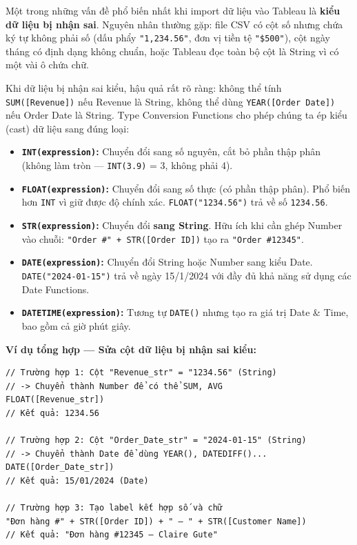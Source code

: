 \documentclass[12pt]{article}
\begin{document}
\noindent Một trong những vấn đề phổ biến nhất khi import dữ liệu vào Tableau là \textbf{kiểu dữ liệu bị nhận sai}. Nguyên nhân thường gặp: file CSV có cột số nhưng chứa ký tự không phải số (dấu phẩy \texttt{"1,234.56"}, đơn vị tiền tệ \texttt{"\$500"}), cột ngày tháng có định dạng không chuẩn, hoặc Tableau đọc toàn bộ cột là String vì có một vài ô chứa chữ.

\noindent Khi dữ liệu bị nhận sai kiểu, hậu quả rất rõ ràng: không thể tính \texttt{SUM([Revenue])} nếu Revenue là String, không thể dùng \texttt{YEAR([Order Date])} nếu Order Date là String. Type Conversion Functions cho phép chúng ta ép kiểu (cast) dữ liệu sang đúng loại:

\begin{itemize}
    \item \textbf{\texttt{INT(expression)}:} Chuyển đổi sang số nguyên, cắt bỏ phần thập phân (không làm tròn --- \texttt{INT(3.9)} = 3, không phải 4).

    \item \textbf{\texttt{FLOAT(expression)}:} Chuyển đổi sang số thực (có phần thập phân). Phổ biến hơn \texttt{INT} vì giữ được độ chính xác. \texttt{FLOAT("1234.56")} trả về số \texttt{1234.56}.

    \item \textbf{\texttt{STR(expression)}:} Chuyển đổi \textbf{sang String}. Hữu ích khi cần ghép Number vào chuỗi: \texttt{"Order \#" + STR([Order ID])} tạo ra \texttt{"Order \#12345"}.

    \item \textbf{\texttt{DATE(expression)}:} Chuyển đổi String hoặc Number sang kiểu Date. \texttt{DATE("2024-01-15")} trả về ngày 15/1/2024 với đầy đủ khả năng sử dụng các Date Functions.

    \item \textbf{\texttt{DATETIME(expression)}:} Tương tự \texttt{DATE()} nhưng tạo ra giá trị Date \& Time, bao gồm cả giờ phút giây.
\end{itemize}

\noindent \textbf{Ví dụ tổng hợp --- Sửa cột dữ liệu bị nhận sai kiểu:}

\begin{aivncodebox}[]
\begin{lstlisting}
// Trường hợp 1: Cột "Revenue_str" = "1234.56" (String)
// -> Chuyển thành Number để có thể SUM, AVG
FLOAT([Revenue_str])
// Kết quả: 1234.56

// Trường hợp 2: Cột "Order_Date_str" = "2024-01-15" (String)
// -> Chuyển thành Date để dùng YEAR(), DATEDIFF()...
DATE([Order_Date_str])
// Kết quả: 15/01/2024 (Date)

// Trường hợp 3: Tạo label kết hợp số và chữ
"Đơn hàng #" + STR([Order ID]) + " — " + STR([Customer Name])
// Kết quả: "Đơn hàng #12345 — Claire Gute"
\end{lstlisting}
\end{aivncodebox}
\end{document}
